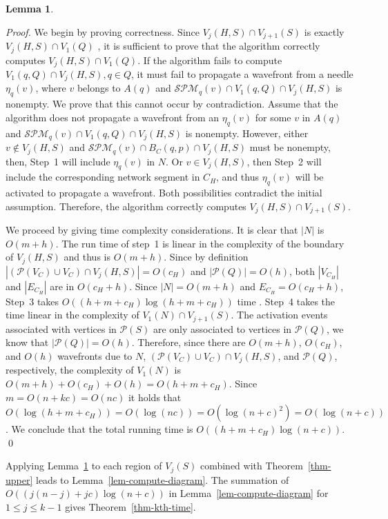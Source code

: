 \documentclass[11pt]{llncs}
\newtheorem{Lemma}{Lemma}
\renewcommand{\P}{\ensuremath{\mathcal{P}}}
\newcommand{\SPM}{\ensuremath{\mathcal{SPM}}}
\begin{document}
\begin{Lemma}\label{lem-compute-region}
\lemcomputeregion
\end{Lemma}
\begin{proof}
We begin by proving correctness.
Since $V_{j}(H, S)\cap V_{j+1}(S)$ is exactly $V_{j}(H, S)\cap V_1(Q)$ \cite{Lee-82},
it is sufficient to prove that the algorithm correctly computes $V_{j}(H, S)\cap V_1(Q)$.
If the algorithm fails to compute $V_1(q, Q)\cap V_{j}(H, S), q\in Q$,
it must fail to propagate a wavefront from a needle $\eta_q(v)$, where $v$ belongs to $A(q)$ and
$\SPM_q(v)\cap V_1(q, Q)\cap V_{j}(H, S)$ is nonempty.
We prove that this cannot occur by contradiction. Assume that the algorithm does not propagate a wavefront from an $\eta_q(v)$ for some $v$ in $A(q)$ and $\SPM_q(v)\cap V_1(q, Q)\cap V_{j}(H, S)$ is nonempty.
However, either $v\notin V_{j}(H, S)$ and $\SPM_q(v)\cap B_C(q, p)\cap V_{j}(H, S)$ must be nonempty, then,
Step~1 will include $\eta_q(v)$ in $N$.
Or $v \in V_{j}(H, S)$, then
Step~2 will include the corresponding network segment in $C_H$,
and thus $\eta_q(v)$ will be activated to propagate a wavefront.
Both possibilities contradict the initial assumption.
Therefore, the algorithm correctly computes $V_{j}(H, S)\cap V_{j+1}(S)$.


We proceed by giving time complexity considerations.
It is clear that $|N|$ is $O(m+h)$.
The run time of step~1 is linear in the complexity of the boundary of $V_{j}(H, S)$
and thus is $O(m+h)$.
Since by definition $|(\P(V_C)\cup V_C)\cap V_{j}(H, S)| = O(c_H)$ and $|\P(Q)|=O(h)$,
both $|V_{C_H}|$ and $|E_{C_H}|$ are in $O(c_H+h)$.
Since $|N|=O(m+h)$ and  $E_{C_H}=O(c_H+h)$,
Step~3 takes $O((h+m+c_H)\log (h+m+c_H))$ time \cite{BKC-09}.
Step~4 takes the time linear in the complexity of $V_{1}(N)\cap V_{j+1}(S)$.
The activation events associated with vertices in $\P(S)$ are only associated to vertices in $\P(Q)$, we know that $|\P(Q)| = O(h)$.
Therefore, since there are $O(m+h)$, $O(c_H)$, and $O(h)$ wavefronts
due to $N$, $(\P(V_C)\cup V_C)\cap V_{j}(H, S)$, and $\P(Q)$, respectively,
the complexity of $V_{1}(N)$ is $O(m+h)+O(c_H)+O(h)=O(h+m+c_H)$.
Since $m=O(n+kc)=O(nc)$ it holds that $O(\log(h+m+c_H))=O(\log(nc))=O(\log(n+c)^2)=O(\log(n+c))$.
We conclude that the total running time is  $O((h+m+c_H)\log (n+c))$.
\qed
\end{proof}



Applying Lemma~\ref{lem-compute-region} to each region of $V_j(S)$ combined with Theorem~\ref{thm-upper}
leads to Lemma~\ref{lem-compute-diagram}.
The summation of $O((j(n-j)+jc)\log(n+c))$ in Lemma~\ref{lem-compute-diagram} for $1\leq j\leq k-1$
gives Theorem~\ref{thm-kth-time}.
\end{document}
